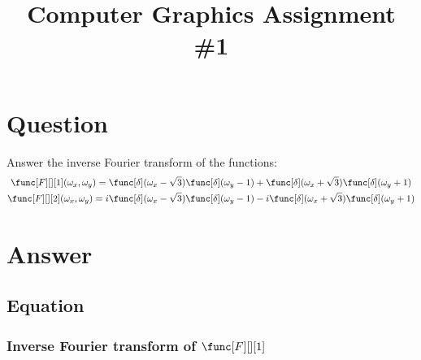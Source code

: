 

\title{Computer Graphics Assignment \#1}


\section{Question}
Answer the inverse Fourier transform of the functions:
$$
\begin{gathered}
    \func[F][][1](\omega_x,\omega_y) = \func[\delta](\omega_x - \sqrt{3})\func[\delta](\omega_y - 1) + \func[\delta](\omega_x + \sqrt{3})\func[\delta](\omega_y + 1) \\
    \func[F][][2](\omega_x,\omega_y) = i\func[\delta](\omega_x - \sqrt{3})\func[\delta](\omega_y - 1) - i\func[\delta](\omega_x + \sqrt{3})\func[\delta](\omega_y + 1)
\end{gathered}
$$

\section{Answer}
\subsection{Equation}
\subsubsection{Inverse Fourier transform of $\func[F][][1]$}

